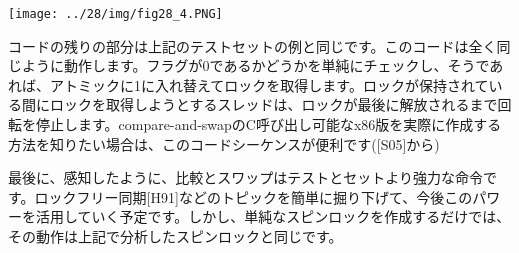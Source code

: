 \texttt{[image: ../28/img/fig28\_4.PNG]}

\begin{Shaded}
\begin{Highlighting}[]
 
   \NormalTok{, }\NormalTok{) == }\NormalTok{)}
\NormalTok{       ; }
\NormalTok{ \}}
\end{Highlighting}
\end{Shaded}

コードの残りの部分は上記のテストセットの例と同じです。このコードは全く同じように動作します。フラグが0であるかどうかを単純にチェックし、そうであれば、アトミックに1に入れ替えてロックを取得します。ロックが保持されている間にロックを取得しようとするスレッドは、ロックが最後に解放されるまで回転を停止します。compare-and-swapのC呼び出し可能なx86版を実際に作成する方法を知りたい場合は、このコードシーケンスが便利です({[}S05{]}から)

\begin{Shaded}
\begin{Highlighting}[]
 
    
   
       
       
       
\NormalTok{       : }
\NormalTok{      : }
\NormalTok{      : }\NormalTok{);}
  
\NormalTok{ \}}
\end{Highlighting}
\end{Shaded}

最後に、感知したように、比較とスワップはテストとセットより強力な命令です。ロックフリー同期{[}H91{]}などのトピックを簡単に掘り下げて、今後このパワーを活用していく予定です。しかし、単純なスピンロックを作成するだけでは、その動作は上記で分析したスピンロックと同じです。

